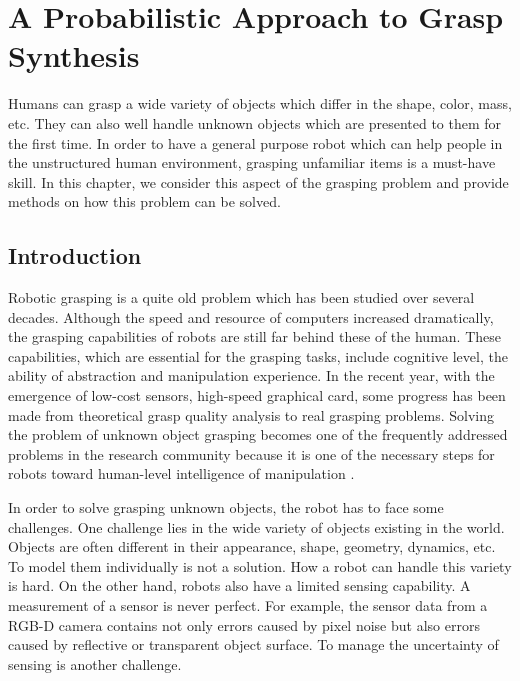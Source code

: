 \chapter{A Probabilistic Approach to Grasp Synthesis}
\label{chapter:gs}
Humans can grasp a wide variety of objects which differ in the shape, color, mass, etc. They can also well handle unknown objects which are presented to them for the first time. In order to have a general purpose robot which can help people in the unstructured human environment, grasping unfamiliar items is a must-have skill. In this chapter, we consider this aspect of the grasping problem and provide methods on how this problem can be solved. 

\section{Introduction}
Robotic grasping is a quite old problem which has been studied over several decades. Although the speed and resource of computers increased dramatically, the grasping capabilities of robots are still far behind these of the human. These capabilities, which are essential for the grasping tasks, include cognitive level, the ability of abstraction and manipulation experience. In the recent year, with the emergence of low-cost sensors, high-speed graphical card, some progress has been made from theoretical grasp quality analysis to real grasping problems. Solving the problem of unknown object grasping becomes one of the frequently addressed problems in the research community because it is one of the necessary steps for robots toward human-level intelligence of manipulation \cite{Mahler2017Dex20}. 

In order to solve grasping unknown objects, the robot has to face some challenges. One challenge lies in the wide variety of objects existing in the world. Objects are often different in their appearance, shape, geometry, dynamics, etc. To model them individually is not a solution. How a robot can handle this variety is hard. On the other hand, robots also have a limited sensing capability. A measurement of a sensor is never perfect. For example, the sensor data from a RGB-D camera contains not only errors caused by pixel noise but also errors caused by reflective or transparent object surface. To manage the uncertainty of sensing is another challenge. 
  
